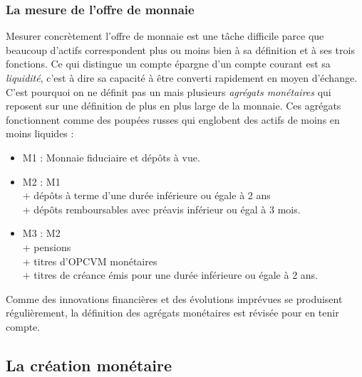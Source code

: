 \documentclass[10pt]{book}
\begin{document}
\subsubsection{La mesure de l'offre de monnaie}
Mesurer concrètement l'offre de monnaie est une tâche difficile parce que beaucoup d'actifs correspondent plus ou moins bien à sa définition et à ses trois fonctions. Ce qui distingue un compte épargne d'un compte courant est sa \textit{liquidité}, c'est à dire sa capacité à être converti rapidement en moyen d'échange. C'est pourquoi on ne définit pas un mais plusieurs \textit{agrégats monétaires} qui reposent sur une définition de plus en plus large de la monnaie. Ces agrégats fonctionnent comme des poupées russes qui englobent des actifs de moins en moins liquides : 
\begin{itemize}
  \item M1 : Monnaie fiduciaire et dépôts à vue.
  \item M2 : M1 \\
    + dépôts à terme d'une durée inférieure ou égale à 2 ans \\
    + dépôts remboursables avec préavis inférieur ou égal à 3 mois.
  \item M3 : M2 \\
    + pensions \\
    + titres d'OPCVM monétaires \\
    + titres de créance émis pour une durée inférieure ou égale à 2 ans.
\end{itemize}
Comme des innovations financières et des évolutions imprévues se produisent régulièrement, la définition des agrégats monétaires est révisée pour en tenir compte.
\subsection{La création monétaire}
\end{document}
